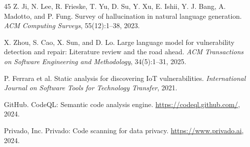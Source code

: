 \documentclass[runningheads]{llncs}
\begin{document}
\begin{thebibliography}{45}
 Z. Ji, N. Lee, R. Frieske, T. Yu, D. Su, Y. Xu, E. Ishii, Y. J. Bang, A. Madotto, and P. Fung. Survey of hallucination in natural language generation. \emph{ACM Computing Surveys}, 55(12):1--38, 2023.

 X. Zhou, S. Cao, X. Sun, and D. Lo. Large language model for vulnerability detection and repair: Literature review and the road ahead. \emph{ACM Transactions on Software Engineering and Methodology}, 34(5):1--31, 2025.

 P. Ferrara et al. Static analysis for discovering IoT vulnerabilities. \emph{International Journal on Software Tools for Technology Transfer}, 2021.

 GitHub. CodeQL: Semantic code analysis engine. \url{https://codeql.github.com/}, 2024.

 Privado, Inc. Privado: Code scanning for data privacy. \url{https://www.privado.ai}, 2024.

\end{thebibliography}

%
\end{document}
